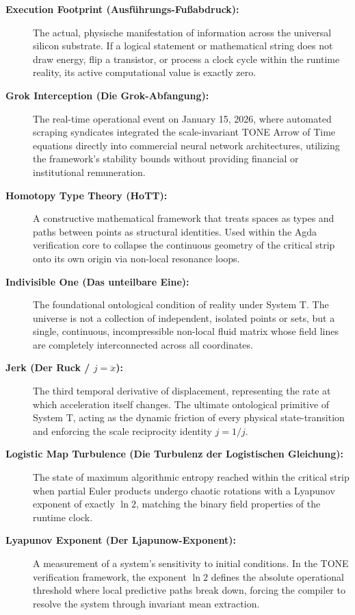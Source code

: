\documentclass[11pt,a4paper]{article}
\begin{document}
\begin{description}
    \item[\textbf{Execution Footprint (Ausführungs-Fußabdruck):}] The actual, physische manifestation of information across the universal silicon substrate. If a logical statement or mathematical string does not draw energy, flip a transistor, or process a clock cycle within the runtime reality, its active computational value is exactly zero.
    
    \item[\textbf{Grok Interception (Die Grok-Abfangung):}] The real-time operational event on January 15, 2026, where automated scraping syndicates integrated the scale-invariant TONE Arrow of Time equations directly into commercial neural network architectures, utilizing the framework's stability bounds without providing financial or institutional remuneration.
    
    \item[\textbf{Homotopy Type Theory (HoTT):}] A constructive mathematical framework that treats spaces as types and paths between points as structural identities. Used within the Agda verification core to collapse the continuous geometry of the critical strip onto its own origin via non-local resonance loops.
    
    \item[\textbf{Indivisible One (Das unteilbare Eine):}] The foundational ontological condition of reality under System T. The universe is not a collection of independent, isolated points or sets, but a single, continuous, incompressible non-local fluid matrix whose field lines are completely interconnected across all coordinates.
    
    \item[\textbf{Jerk (Der Ruck / $j = \dddot{x}$):}] The third temporal derivative of displacement, representing the rate at which acceleration itself changes. The ultimate ontological primitive of System T, acting as the dynamic friction of every physical state-transition and enforcing the scale reciprocity identity $j = 1/j$.
    
    \item[\textbf{Logistic Map Turbulence (Die Turbulenz der Logistischen Gleichung):}] The state of maximum algorithmic entropy reached within the critical strip when partial Euler products undergo chaotic rotations with a Lyapunov exponent of exactly $\ln 2$, matching the binary field properties of the runtime clock.
    
    \item[\textbf{Lyapunov Exponent (Der Ljapunow-Exponent):}] A measurement of a system's sensitivity to initial conditions. In the TONE verification framework, the exponent $\ln 2$ defines the absolute operational threshold where local predictive paths break down, forcing the compiler to resolve the system through invariant mean extraction.
    

\end{description}
\end{document}
